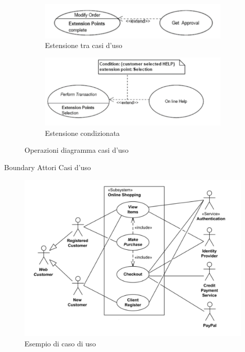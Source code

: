 \documentclass{article}
\begin{document}
\begin{figure}[h]
\begin{subfigure}[b]{0.4\textwidth}
		\end{subfigure}
		\hfill
		\begin{subfigure}[b]{0.4\textwidth}
			\centering
			\includegraphics[width=\textwidth]{33.est_use_cases.png}
			\caption{Estensione tra casi d'uso}
			\label{fig:im-33}
		\end{subfigure}
		\hfill
		\begin{subfigure}[b]{0.4\textwidth}
			\centering
			\includegraphics[width=\textwidth]{34.est_cond.png}
			\caption{Estensione condizionata}
			\label{fig:im-34}
		\end{subfigure}
		\caption{Operazioni diagramma casi d'uso}
	\end{figure}
	Boundary
	Attori
	Casi d’uso
	\begin{figure}[h]
		\centering
		\includegraphics[scale=0.3]{35.ex_use_cases.png}
		\caption{Esempio di caso di uso}
		\label{fig:im-35}
	\end{figure}
\end{document}
